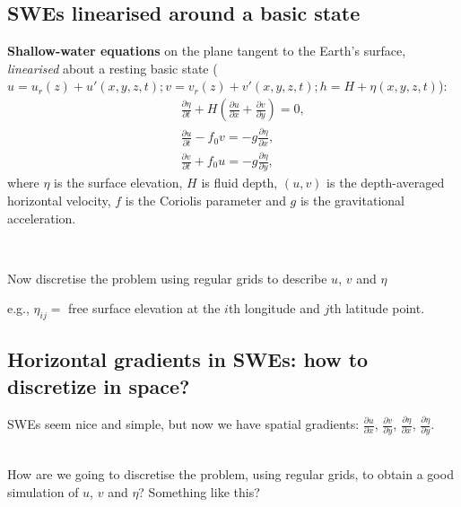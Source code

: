 \subsection{SWEs linearised around a basic state} 

{\bf Shallow-water equations} on the
plane tangent to the Earth's surface, {\em linearised} about a resting basic state ($u=u_r(z)+u'(x,y,z,t); v=v_r(z)+v'(x,y,z,t);h=H+\eta(x,y,z,t)$):
\begin{eqnarray}
	&&\frac{\partial \eta}{\partial t} + H \left(
	\frac{\partial u}{\partial x}+\frac{\partial v}{\partial y}\right) = 0,
	\\
	&&\frac{\partial u}{\partial t} - f_0 v = - g\frac{\partial \eta}{\partial x}, \\
	&&\frac{\partial v}{\partial t} + f_0 u = - g\frac{\partial \eta}{\partial y}, 
\end{eqnarray}
where $\eta$ is the surface elevation, $H$ is fluid depth, $(u,v)$ is
the depth-averaged horizontal velocity, $f$ is the Coriolis parameter
and $g$ is the gravitational acceleration. 

~~

Now discretise the problem using regular grids to describe $u$, $v$ and $\eta$ 

e.g., $\eta_{ij}=$ free surface elevation at the $i$th longitude and $j$th
latitude point.

\subsection { Horizontal gradients in SWEs: how to discretize in space?} 

SWEs seem nice and simple, but now we have spatial gradients: $\frac{\partial u}{\partial x}$, $\frac{\partial v}{\partial y}$, $\frac{\partial \eta}{\partial x}$, $\frac{\partial \eta}{\partial y}$.\\

~

How are we going to discretise the problem, using regular grids, to obtain a good simulation of $u$, $v$ and $\eta$? Something like this?

